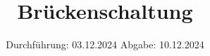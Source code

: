 

\subject{V302}
\title{Brückenschaltung}
\date{%
  Durchführung: 03.12.2024
  \hspace{3em}
  Abgabe: 10.12.2024
}



\maketitle
\thispagestyle{empty}
\tableofcontents
\newpage






\printbibliography{}


